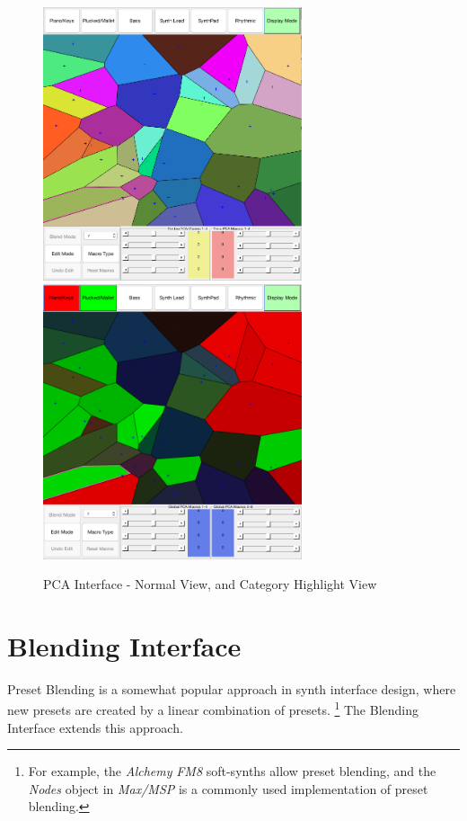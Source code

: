 \documentclass[11pt, oneside]{report}   	%
\begin{document}
\begin{figure}[h] 
	\centering
	\hspace*{-0.2cm}
	\includegraphics[width = 3.0in]{PCAInterface1.png}
	\hspace*{0.1cm}
	\includegraphics[width = 3.0in]{PCAInterface2.png}
	\caption{PCA Interface - Normal View, and Category Highlight View}
	\label{fig:PCAInterface}
\end{figure}

\section{Blending Interface}
Preset Blending is a somewhat popular approach in synth interface design, where new presets are created by a linear combination of presets. \footnote{For example, the \emph{Alchemy} \emph{FM8} soft-synths allow preset blending, and the  \emph{Nodes} object in \emph{Max/MSP} is a commonly used implementation of preset blending.} The Blending Interface extends this approach.
\end{document}
